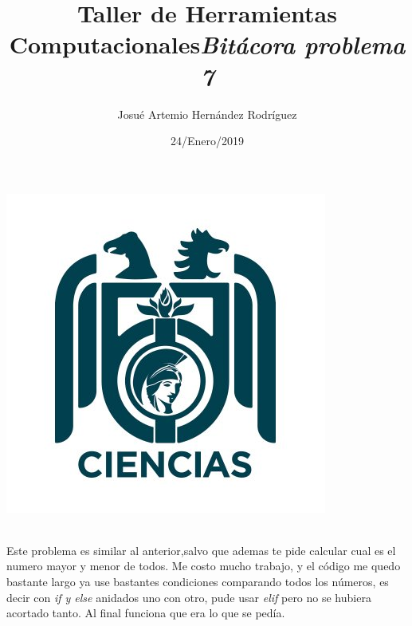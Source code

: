 \label{key}\documentclass[letterpaper, 12pt,oneside]{article}
\title{\Huge Taller de Herramientas Computacionales}
\author{Josué Artemio Hernández Rodríguez}
\date{24/Enero/2019}
\begin{document}
	\maketitle
	\begin{center}
		\includegraphics[scale=0.7]{3.jpg}
	\end{center}

	\newpage
	
	\title{\huge \textit{Bitácora problema 7 }}\\

	Este problema es similar al anterior,salvo que ademas te pide calcular cual es el numero mayor y menor de todos. Me costo mucho trabajo, y el código me quedo bastante largo ya use bastantes condiciones comparando todos los números, es decir con \textit{if y else} anidados uno con otro, pude usar \textit{elif} pero no se hubiera acortado tanto. Al final funciona que era lo que se pedía.
	 
\end{document}
